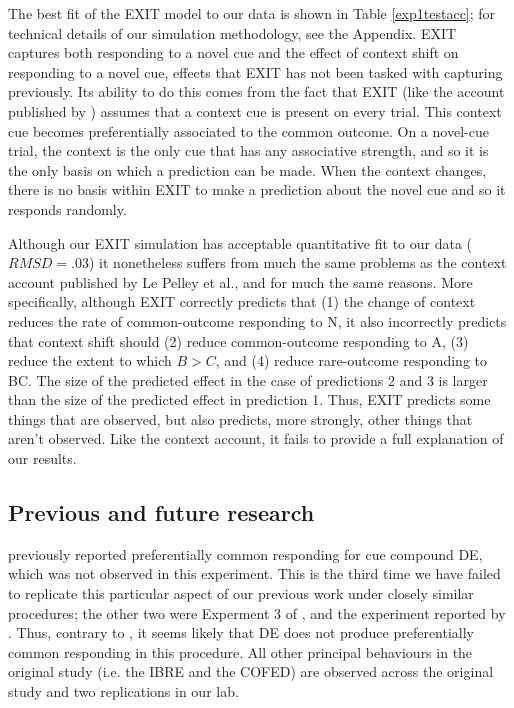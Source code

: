 \documentclass[twocolumn]{article}
\begin{document}
{The best fit of the EXIT model to our data is shown in Table \ref{exp1testacc}; for technical details of our simulation methodology, see the Appendix. EXIT captures both responding to a novel cue and the effect of context shift on responding to a novel cue, effects that EXIT has not been tasked with capturing previously. Its ability to do this comes from the fact that EXIT (like the account published by \citeauthor{LePelley2016}) assumes that a context cue is present on every trial. This context cue becomes preferentially associated to the common outcome. On a novel-cue trial, the context is the only cue that has any associative strength, and so it is the only basis on which a prediction can be made. When the context changes, there is no basis within EXIT to make a prediction about the novel cue and so it responds randomly.

Although our EXIT simulation has acceptable quantitative fit to our data ($RMSD = .03$) it nonetheless suffers from much the same problems as the context account published by Le Pelley et al., and for much the same reasons. More specifically, although EXIT correctly predicts that (1) the change of context reduces the rate of common-outcome responding to N, it also incorrectly predicts that context shift should (2) reduce common-outcome responding to A, (3) reduce the extent to which $B > C$, and (4) reduce rare-outcome responding to BC. The size of the predicted effect in the case of predictions 2 and 3 is larger than the size of the predicted effect in prediction 1. Thus, EXIT predicts some things that are observed, but also predicts, more strongly, other things that aren't observed. Like the context account, it fails to provide a full explanation of our results. 

\subsection{Previous and future research}

\cite{Wills2014} previously reported preferentially common responding for cue compound DE, which was not observed in this experiment. This is the third time we have failed to replicate this particular aspect of our previous work under closely similar procedures; the other two were Experment 3 of \cite{Inkster2019}, and the experiment reported by \cite{Inkster2019c}. Thus, contrary to \cite{Wills2014}, it seems likely that DE does not produce preferentially common responding in this procedure. All other principal behaviours in the original study (i.e. the IBRE and the COFED) are observed across the original study and two replications in our lab.

}
\end{document}
